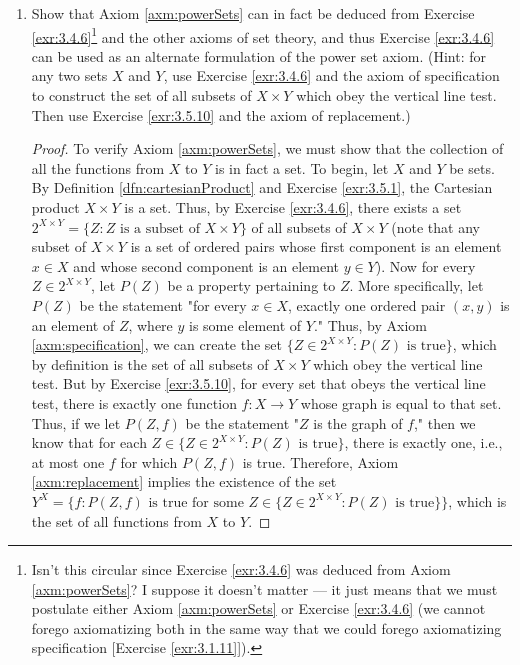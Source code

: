 \documentclass[../main.tex]{subfiles}
\begin{document}
\begin{enumerate}[ref={\thesection.\arabic*}]
    \item \label{exr:3.5.11}Show that Axiom \ref{axm:powerSets} can in fact be deduced from Exercise \ref{exr:3.4.6}\footnote{Isn't this circular since Exercise \ref{exr:3.4.6} was deduced from Axiom \ref{axm:powerSets}? I suppose it doesn't matter --- it just means that we must postulate either Axiom \ref{axm:powerSets} or Exercise \ref{exr:3.4.6} (we cannot forego axiomatizing both in the same way that we could forego axiomatizing specification [Exercise \ref{exr:3.1.11}]).} and the other axioms of set theory, and thus Exercise \ref{exr:3.4.6} can be used as an alternate formulation of the power set axiom. (Hint: for any two sets $X$ and $Y$, use Exercise \ref{exr:3.4.6} and the axiom of specification to construct the set of all subsets of $X\times Y$ which obey the vertical line test. Then use Exercise \ref{exr:3.5.10} and the axiom of replacement.)
    \begin{proof}
        To verify Axiom \ref{axm:powerSets}, we must show that the collection of all the functions from $X$ to $Y$ is in fact a set. To begin, let $X$ and $Y$ be sets. By Definition \ref{dfn:cartesianProduct} and Exercise \ref{exr:3.5.1}, the Cartesian product $X\times Y$ is a set. Thus, by Exercise \ref{exr:3.4.6}, there exists a set $2^{X\times Y}=\{Z:Z\text{ is a subset of }X\times Y\}$ of all subsets of $X\times Y$ (note that any subset of $X\times Y$ is a set of ordered pairs whose first component is an element $x\in X$ and whose second component is an element $y\in Y$). Now for every $Z\in 2^{X\times Y}$, let $P(Z)$ be a property pertaining to $Z$. More specifically, let $P(Z)$ be the statement "for every $x\in X$, exactly one ordered pair $(x,y)$ is an element of $Z$, where $y$ is some element of $Y$." Thus, by Axiom \ref{axm:specification}, we can create the set $\{Z\in 2^{X\times Y}:P(Z)\text{ is true}\}$, which by definition is the set of all subsets of $X\times Y$ which obey the vertical line test. But by Exercise \ref{exr:3.5.10}, for every set that obeys the vertical line test, there is exactly one function $f:X\to Y$ whose graph is equal to that set. Thus, if we let $P(Z,f)$ be the statement "$Z$ is the graph of $f$," then we know that for each $Z\in\{Z\in 2^{X\times Y}:P(Z)\text{ is true}\}$, there is exactly one, i.e., at most one $f$ for which $P(Z,f)$ is true. Therefore, Axiom \ref{axm:replacement} implies the existence of the set $Y^X=\{f:P(Z,f)\text{ is true for some }Z\in\{Z\in 2^{X\times Y}:P(Z)\text{ is true}\}\}$, which is the set of all functions from $X$ to $Y$.
    \end{proof}

\end{enumerate}
\end{document}
